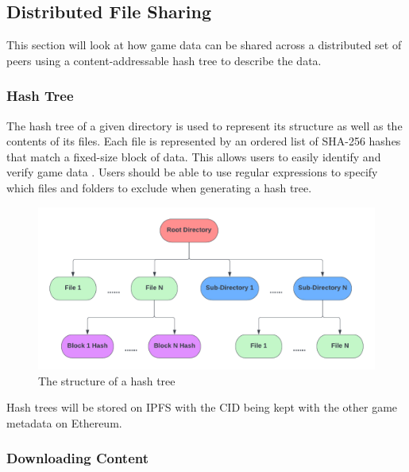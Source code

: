 
\subsection{Distributed File Sharing}
\label{subsec:design-p2p}

This section will look at how game data can be shared across a distributed set of peers using a content-addressable hash tree to describe the data.  

\subsubsection*{Hash Tree}
\label{subsubsec:hash-tree}

The hash tree of a given directory is used to represent its structure as well as the contents of its files. Each file is represented by an ordered list of SHA-256 hashes that match a fixed-size block of data. This allows users to easily identify and verify game data . Users should be able to use regular expressions to specify which files and folders to exclude when generating a hash tree.

\begin{figure}[ht]
  \centering
  \includegraphics[width=.85\textwidth]{assets/images/diagrams/block-body.png}
  \caption{The structure of a hash tree}
  \label{fig:hash-storage}
\end{figure}

\newparagraph
Hash trees will be stored on IPFS with the CID being kept with the other game metadata on Ethereum.

\subsubsection*{Downloading Content}

\newcommand{\seeder}{$P_{seeder}$~}
\newcommand{\downloader}{$P_{downloader}$~}

